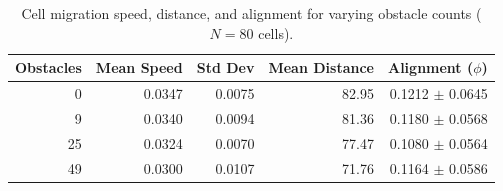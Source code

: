 \begin{table}[h]
\centering
\caption{Cell migration speed, distance, and alignment for varying obstacle counts ($N=80$ cells).}
\label{tab:speedcheck}
\begin{tabular}{r r r r r}
\toprule
Obstacles & Mean Speed & Std Dev & Mean Distance & Alignment ($\phi$) \\
\midrule
0 & 0.0347 & 0.0075 & 82.95 & 0.1212 $\pm$ 0.0645 \\
9 & 0.0340 & 0.0094 & 81.36 & 0.1180 $\pm$ 0.0568 \\
25 & 0.0324 & 0.0070 & 77.47 & 0.1080 $\pm$ 0.0564 \\
49 & 0.0300 & 0.0107 & 71.76 & 0.1164 $\pm$ 0.0586 \\
\bottomrule
\end{tabular}
\end{table}
